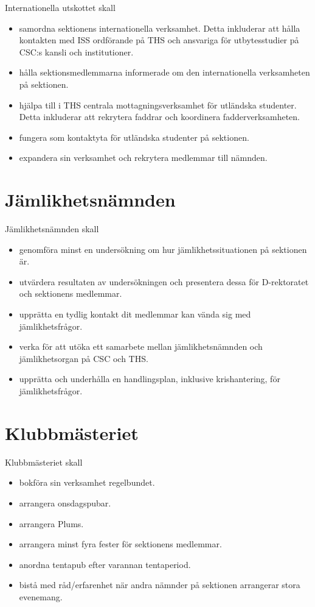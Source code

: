 \documentclass{dgovdoc}
\begin{document}
Internationella utskottet skall

\begin{itemize}
\item samordna sektionens internationella verksamhet. Detta inkluderar att
  hålla kontakten med ISS ordförande på THS och ansvariga för utbytesstudier på
  CSC:s kansli och institutioner.
\item hålla sektionsmedlemmarna informerade om den internationella verksamheten
  på sektionen.
\item hjälpa till i THS centrala mottagningsverksamhet för utländska studenter.
  Detta inkluderar att rekrytera faddrar och koordinera fadderverksamheten.
\item fungera som kontaktyta för utländska studenter på sektionen.
\item expandera sin verksamhet och rekrytera medlemmar till nämnden.
\end{itemize}

\section{Jämlikhetsnämnden}

Jämlikhetsnämnden skall

\begin{itemize}
\item genomföra minst en undersökning om hur jämlikhetssituationen på sektionen
  är.
\item utvärdera resultaten av undersökningen och presentera dessa för
  D-rektoratet och sektionens medlemmar.
\item upprätta en tydlig kontakt dit medlemmar kan vända sig med
  jämlikhetsfrågor.
\item verka för att utöka ett samarbete mellan jämlikhetsnämnden och
  jämlikhetsorgan på CSC och THS.
\item upprätta och underhålla en handlingsplan, inklusive krishantering, för
  jämlikhetsfrågor.
\end{itemize}

\section{Klubbmästeriet}

Klubbmästeriet skall

\begin{itemize}
\item bokföra sin verksamhet regelbundet.
\item arrangera onsdagspubar.
\item arrangera Plums.
\item arrangera minst fyra fester för sektionens medlemmar.
\item anordna tentapub efter varannan tentaperiod.
\item bistå med råd/erfarenhet när andra nämnder på sektionen arrangerar stora
  evenemang.
\end{itemize}
\end{document}
